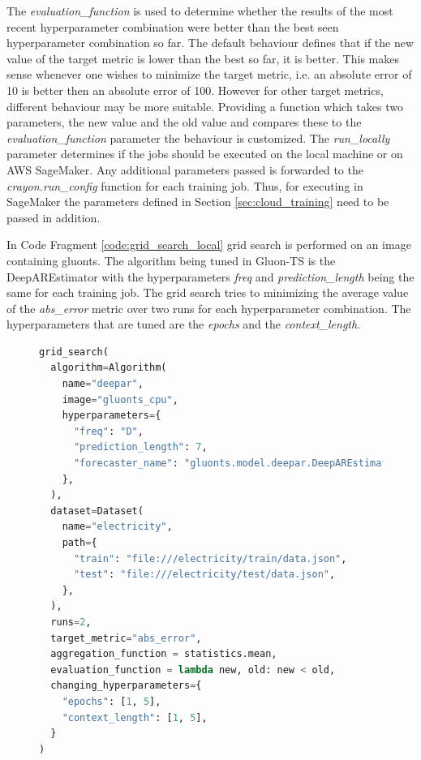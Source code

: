 The \textit{evaluation\_function} is used to determine whether the results of the most recent hyperparameter combination were better than the best seen hyperparameter combination so far. The default behaviour defines that if the new value of the target metric is lower than the best so far, it is better. This makes sense whenever one wishes to minimize the target metric, i.e. an absolute error of 10 is better then an absolute error of 100. However for other target metrics, different behaviour may be more suitable. Providing a function which takes two parameters, the new value and the old value and compares these to the \textit{evaluation\_function} parameter the behaviour is customized. The \textit{run\_locally} parameter determines if the jobs should be executed on the local machine or on AWS SageMaker. Any additional parameters passed is forwarded to the \textit{crayon.run\_config} function for each training job. Thus, for executing in SageMaker the parameters defined in Section \ref{sec:cloud_training} need to be passed in addition.

In Code Fragment \ref{code:grid_search_local} grid search is performed on an image containing gluonts. The algorithm being tuned in Gluon-TS is the DeepAREstimator with the hyperparameters \textit{freq} and \textit{prediction\_length} being the same for each training job. The grid search tries to minimizing the average value of the \textit{abs\_error} metric over two runs for each hyperparameter combination. The hyperparameters that are tuned are the \textit{epochs} and the \textit{context\_length}.
\begin{figure}
  \begin{lstlisting}[language=Python, label={code:grid_search_local}, caption={Grid search running locally.}]
grid_search(
  algorithm=Algorithm(
    name="deepar",
    image="gluonts_cpu",
    hyperparameters={
      "freq": "D",
      "prediction_length": 7,
      "forecaster_name": "gluonts.model.deepar.DeepAREstimator",
    },
  ),
  dataset=Dataset(
    name="electricity",
    path={
      "train": "file:///electricity/train/data.json",
      "test": "file:///electricity/test/data.json",
    },
  ),
  runs=2,
  target_metric="abs_error",
  aggregation_function = statistics.mean, 
  evaluation_function = lambda new, old: new < old,
  changing_hyperparameters={
    "epochs": [1, 5],
    "context_length": [1, 5],
  }
)
  \end{lstlisting}
\end{figure}


